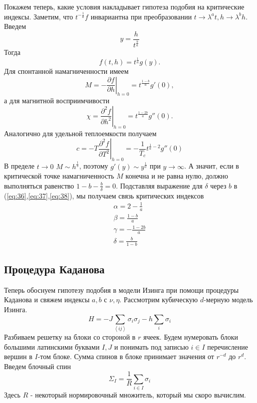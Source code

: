 \documentclass[a4paper,12pt]{article}
\theoremstyle{definition}
\theoremstyle{definition}
\theoremstyle{definition}
\begin{document}
Покажем теперь, какие условия накладывает гипотеза подобия на критические индексы. Заметим, что $t^{-\frac{1}{a}}f$ инвариантна при преобразовании $t\to \lambda^a t, h\to \lambda^b h$. Введем
\begin{equation}
  \label{eq:34}
  y=\frac{h}{t^{\frac{b}{a}}}
\end{equation}
Тогда
\begin{equation}
  \label{eq:35}
  f(t,h)=t^{\frac{1}{a}}g(y).
\end{equation}
Для спонтанной намагниченности имеем
\begin{equation}
  \label{eq:36}
  M=-\left.\frac{\partial f}{\partial h}\right|_{h=0}=t^{\frac{1-b}{a}}g'(0),
\end{equation}
а для  магнитной восприимчивости
\begin{equation}
  \label{eq:37}
  \chi=\left.\frac{\partial^2 f}{\partial h^2}\right|_{h=0}=t^{\frac{1-2b}{a}}g''(0).
\end{equation}
Аналогично для удельной теплоемкости получаем
\begin{equation}
  \label{eq:38}
  c=-T\left.\frac{\partial^2 f}{\partial T^2}\right|_{h=0}=-\frac{1}{T_c}t^{\frac{1}{a}-2}g''(0)
\end{equation}
В пределе $t\to 0$ $M\sim h^{\frac{1}{\delta}}$, поэтому $g'(y)\sim y^{\frac{1}{\delta}}$ при $y\to \infty$. А значит, если в критической точке намагниченность $M$ конечна и не равна нулю, должно выполняться равенство $1-b-\frac{b}{\delta}=0$. Подставляя выражение для $\delta$ через $b$ в (\ref{eq:36},\ref{eq:37},\ref{eq:38}), мы получаем связь критических индексов
  \begin{eqnarray}
    \label{eq:39}
    \alpha=2-\frac{1}{a}\\
    \beta=\frac{1-b}{a}\\
    \gamma=-\frac{1-2b}{a}\\
    \delta=\frac{b}{1-b}
  \end{eqnarray}
\subsection{Процедура Каданова}
\label{sec:kadanoff-procedure}
Теперь обоснуем гипотезу подобия в модели Изинга при помощи процедуры Каданова и свяжем индексы $a,b$ с $\nu,\eta$.
Рассмотрим кубическую $d$-мерную модель Изинга.
\begin{equation}
  \label{eq:40}
  H=-J\sum_{\left<ij\right>}\sigma_i \sigma_j-h\sum_i \sigma_i
\end{equation}
Разбиваем решетку на блоки со стороной в $r$ ячеек. Будем нумеровать блоки большими латинскими буквами $I,J$ и понимать под записью $i\in I$ перечисление вершин в $I$-том блоке.
Сумма спинов в блоке принимает значения от $r^{-d}$ до $r^d$. Введем блочный спин
\begin{equation}
  \label{eq:41}
  \Sigma_I=\frac{1}{R}\sum_{i\in I}\sigma_i
\end{equation}
Здесь $R$ - некоторый нормировочный множитель, который мы скоро вычислим.
\end{document}
